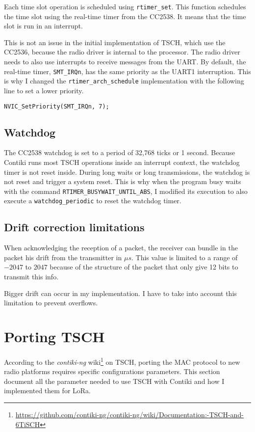 Each time slot operation is scheduled using \lstinline{rtimer_set}.
This function schedules the time slot using the real-time timer from the CC2538.
It means that the time slot is run in an interrupt.

This is not an issue in the initial implementation of TSCH, which use the
CC2536, because the radio driver is internal to the processor.
The radio driver needs to also use interrupts to receive messages from the UART.
By default, the real-time timer, \lstinline{SMT_IRQn}, has the same priority as
the UART1 interruption.
This is why I changed the \lstinline{rtimer_arch_schedule} implementation with
the following line to set a lower priority.

\begin{lstlisting}
NVIC_SetPriority(SMT_IRQn, 7);
\end{lstlisting}

\subsection{Watchdog}

The CC2538 watchdog is set to a period of 32,768 ticks or 1 second.
Because Contiki runs most TSCH operations inside an interrupt
context, the watchdog timer is not reset inside.
During long waits or long transmissions, the watchdog is not reset and trigger
a system reset.
This is why when the program busy waits with the command
\lstinline{RTIMER_BUSYWAIT_UNTIL_ABS}, I modified its execution to also execute
a \lstinline{watchdog_periodic} to reset the watchdog timer.

\subsection{Drift correction limitations}

When acknowledging the reception of a packet, the receiver can bundle in the
packet his drift from the transmitter in $\mu s$.
This value is limited to a range of $-2047$ to $2047$ because of the structure
of the packet that only give 12 bits to transmit this info.

Bigger drift can occur in my implementation.
I have to take into account this limitation to prevent overflows.

\section{Porting TSCH}

According to the \emph{contiki-ng}
wiki\footnote{\url{https://github.com/contiki-ng/contiki-ng/wiki/Documentation:-TSCH-and-6TiSCH}}
on TSCH, porting the MAC protocol to new radio platforms requires specific
configurations parameters.
This section document all the parameter needed to use TSCH with Contiki and how
I implemented them for LoRa.

